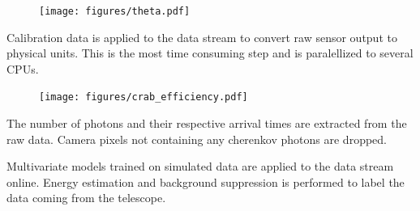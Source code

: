 \begin{multicols}{2}
\begin{center}
        \begin{streamblock}[equal height group=C, width=0.6\linewidth]{-5mm}{-5mm}{}%
          \begin{multicols}{2}
            \begin{figure}
              \texttt{[image: figures/theta.pdf]}
            \end{figure}
            \columnbreak
            Calibration data is applied to the data stream to convert raw sensor output to physical units. This is the most time consuming step and
            is paralellized to several CPUs.
          \end{multicols}
        \end{streamblock}%

        \begin{streamblock}[equal height group=C, width=0.6\linewidth]{-5mm}{-5mm}{}%
          \begin{multicols}{2}
            \begin{figure}
              \texttt{[image: figures/crab\_efficiency.pdf]}
            \end{figure}
            \columnbreak
              The number of photons and their respective arrival times are extracted from the raw data. Camera pixels not containing
              any cherenkov photons are dropped.
          \end{multicols}
        \end{streamblock}%

        \begin{streamblock}[equal height group=C, width=0.6\linewidth]{-5mm}{-5mm}{}%
          \begin{multicols}{2}
            \begin{footnotesize}
            \begin{figure}
            \end{figure}
          \end{footnotesize}
            \columnbreak
            Multivariate models trained on simulated data are applied to the data stream online. Energy estimation and
            background suppression is performed to label the data coming from the telescope.
          \end{multicols}
        \end{streamblock}%



\end{center}
\end{multicols}
